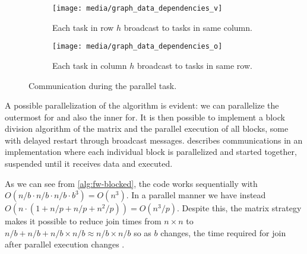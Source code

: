 \begin{figure}[htbp]
    \centering
    \begin{subfigure}[t]{0.3\textwidth}
        \centering
        \texttt{[image: media/graph\_data\_dependencies\_v]}
        \caption{Each task in row \(h\) broadcast to tasks in same column.}
        \label{fig:data-dependencies-v}
    \end{subfigure}
    \begin{subfigure}[t]{0.3\textwidth}
        \centering
        \texttt{[image: media/graph\_data\_dependencies\_o]}
        \caption{Each task in column \(h\) broadcast to tasks in same row.}
        \label{fig:data-dependencies-o}
    \end{subfigure}
    \caption{Communication during the parallel task.}
    \label{fig:communication-during-parallel-task}
\end{figure}

A possible parallelization of the algorithm is evident: we can parallelize the outermost for and also the inner for.
It is then possible to implement a block division algorithm of the matrix and the parallel execution of all blocks, some with delayed restart through broadcast messages.
  describes communications in an implementation where each individual block is parallelized and started together, suspended until it receives data and executed.

As we can see from \cref{alg:fw-blocked}, the code works sequentially with \(O(n/b \cdot n/b \cdot n/b \cdot b^3) =O(n^3) \).
In a parallel manner we have instead \(O(n \cdot (1+n/p+n/p+ n^2/p)) = O(n^3/p)\).
Despite this, the matrix strategy makes it possible to reduce join times from \(n\times n\) to \(n/b + n/b + n/b \times n/b \approx n/b \times n/b\) so as \(b\) changes, the time required for join after parallel execution changes \cite{rucci}.

\FloatBarrier
